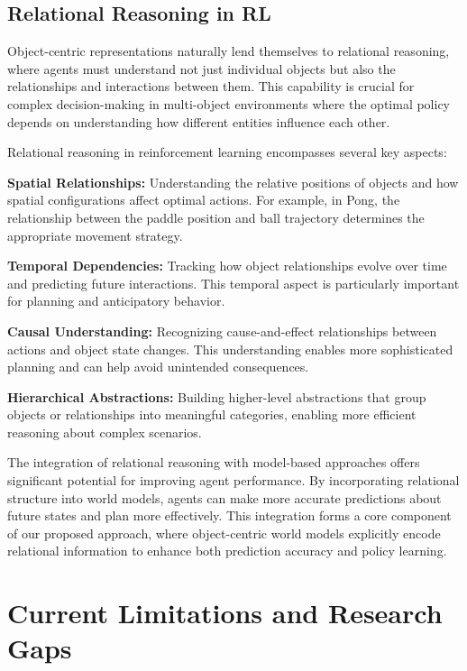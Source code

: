 \documentclass[
	english,
	ruledheaders=section,
	class=report,
	thesis={type=master},
	accentcolor=9c,
	custommargins=true,
	marginpar=false,
	parskip=half-,
	fontsize=11pt,
]{tudapub}
\begin{document}
\subsection{Relational Reasoning in RL}
\label{subsec:relational_reasoning}

Object-centric representations naturally lend themselves to relational reasoning, where agents must understand not just individual objects but also the relationships and interactions between them. This capability is crucial for complex decision-making in multi-object environments where the optimal policy depends on understanding how different entities influence each other.

Relational reasoning in reinforcement learning encompasses several key aspects:

\textbf{Spatial Relationships:} Understanding the relative positions of objects and how spatial configurations affect optimal actions. For example, in Pong, the relationship between the paddle position and ball trajectory determines the appropriate movement strategy.

\textbf{Temporal Dependencies:} Tracking how object relationships evolve over time and predicting future interactions. This temporal aspect is particularly important for planning and anticipatory behavior.

\textbf{Causal Understanding:} Recognizing cause-and-effect relationships between actions and object state changes. This understanding enables more sophisticated planning and can help avoid unintended consequences.

\textbf{Hierarchical Abstractions:} Building higher-level abstractions that group objects or relationships into meaningful categories, enabling more efficient reasoning about complex scenarios.

The integration of relational reasoning with model-based approaches offers significant potential for improving agent performance. By incorporating relational structure into world models, agents can make more accurate predictions about future states and plan more effectively. This integration forms a core component of our proposed approach, where object-centric world models explicitly encode relational information to enhance both prediction accuracy and policy learning.

\section{Current Limitations and Research Gaps}
\label{sec:limitations}
\end{document}
